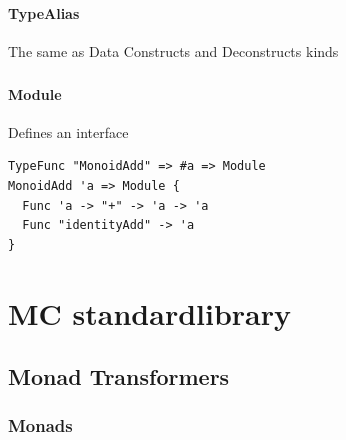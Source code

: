 \begin{frame}[fragile]
   \frametitle{\subsecname}
   \framesubtitle{TypeAlias}

   The same as Data
   Constructs and Deconstructs kinds
\end{frame}

\begin{frame}[fragile]
   \frametitle{\subsecname}
   \framesubtitle{Module}

   Defines an interface
   \begin{lstlisting}
TypeFunc "MonoidAdd" => #a => Module
MonoidAdd 'a => Module {
  Func 'a -> "+" -> 'a -> 'a
  Func "identityAdd" -> 'a
}
   \end{lstlisting}
\end{frame}

\section{MC standardlibrary}
\subsection{Monad Transformers}
\subsubsection{Monads}


